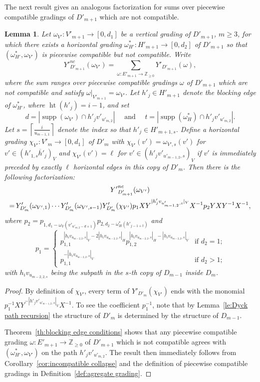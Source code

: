 \documentclass[10pt]{amsart}
\newtheorem{lemma}[theorem]{Lemma}
\theoremstyle{definition}
\newcommand{\ZZ}{\mathbb{Z}}
\DeclareMathOperator{\hgt}{ht}
\DeclareMathOperator{\supp}{supp}
\newcommand*{\Mk}{\mkern -2mu}
\begin{document}
The next result gives an analogous factorization for sums over piecewise compatible gradings of $D'_{m+1}$ which are not compatible.
\begin{lemma}
 \label{le:incompatible factorization 2}
 Let $\omega_{V'}:V'_{m+1}\to[0,d_1]$ be a vertical grading of $D'_{m+1}$, $m\ge3$, for which there exists a horizontal grading $\omega^*_{H'}:H'_{m+1}\to[0,d_2]$ of $D'_{m+1}$ so that $(\omega^*_{H'},\omega_{V'})$ is piecewise compatible but not compatible.
 Write 
 \[{Y'}_{D'_{m+1}}^{nc}(\omega_{V'})=\sum\limits_{\omega:E'_{m+1}\to\ZZ_{\ge0}}Y'_{D'_{m+1}}(\omega),\]
 where the sum ranges over piecewise compatible gradings $\omega$ of $D'_{m+1}$ which are not compatible and satisfy $\omega|_{V'_{m+1}}=\omega_{V'}$.
 Let $h'_j\in H'_{m+1}$ denote the blocking edge of $\omega^*_{H'}$, where $\hgt(h'_j)=i-1$, and set 
 \[d=|\supp(\omega_{V'})\cap h'_jv'_{u'_{m,2}}|\quad\text{ and }\quad t=|\supp(\omega^*_H)\cap h'_jv'_{u'_{m,2}}|.\]
 Let $s=\left\lceil\frac{i}{u_{m-1,1}}\right\rceil$ denote the index so that $h'_j\in H'_{m+1,s}$.
 Define a horizontal grading $\chi_{V'}:V'_m\to[0,d_1]$ of $D'_m$ with $\chi_{V'}(v')=\omega_{V',s}(v')$ for $v'\in (h'_{1,s}\overline{h}'_j)_V$ and $\chi_{V'}(v')=\ell$ for $v'\in (h'_jv'_{u'_{m-1,2},s})_V$ if $v'$ is immediately preceded by exactly $\ell$ horizontal edges in this copy of $D'_m$.
 Then there is the following factorization:
 \begin{multline}
 \label{eq:incompatible factorization 2}
 {Y'}_{D'_{m+1}}^{nc}(\omega_{V'})\\
 =\Mk Y'_{D'_m}(\omega_{V',1})\cdots Y'_{D'_m}(\omega_{V',s-1})Y'_{D'_m}(\chi_{V'})p_1XY^{|h'_jv_{u'_{m-1,2},s}|_V}X^{-1} p_2YXY^{-1}X^{-1},
 \end{multline}
 where $p_2=p_{1,d_1-\omega_V(v'_{u'_{m,2}-d+1})}p_{2,d_2-\omega^*_H(h'_{j-1+t})}$ and
 \[p_1=\begin{cases} p_{1,1}^{|h_iv_{u_{m-2,2},s}|_V-2|h_iv_{u_{m-2,2},s}|_H}p_{1,2}^{|h_iv_{u_{m-2,2},s}|_H-|h_iv_{u_{m-2,2},s}|_V} & \text{if $d_2=1$;}\\ 
 p_{1,1}^{-|h_iv_{u_{m-2,2},s}|_V} & \text{if $d_2>1$;}\end{cases}\]
 with $h_iv_{u_{m-2,2,s}}$ being the subpath in the $s$-th copy of $D_{m-1}$ inside $D_m$.
\end{lemma}
\begin{proof}
 By definition of $\chi_{V'}$, every term of $Y'_{D'_m}(\chi_{V'})$ ends with the monomial $p_1^{-1}XY^{-|h'_jv'_{u'_{m-1,2},s}|_V}X^{-1}$.
 To see the coefficient $p_1^{-1}$, note that by Lemma~\ref{le:Dyck path recursion} the structure of $D'_m$ is determined by the structure of $D_{m-1}$.

 Theorem~\ref{th:blocking edge conditions} shows that any piecewise compatible grading $\omega:E'_{m+1}\to\ZZ_{\ge0}$ of $D'_{m+1}$ which is not compatible agrees with $(\omega^*_{H'},\omega_{V'})$ on the path $h'_jv'_{u'_{m,2}}$.
 The result then immediately follows from Corollary~\ref{cor:incompatible collapse} and the definition of piecewise compatible gradings in Definition~\ref{def:agregate grading}.
\end{proof}
\end{document}
